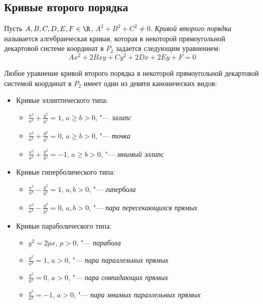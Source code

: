 {\subsection{Кривые второго порядка}

\begin{definition}
	Пусть $A, B, C, D, E, F \in \R$, $A^2 + B^2 + C^2 \ne 0$. \textit{Кривой второго порядка} называется алгебраическая кривая, которая в некоторой прямоугольной декартовой системе координат в $P_2$ задается следующим уравнением:
	\[Ax^2 + 2Bxy + Cy^2 + 2Dx + 2Ey + F = 0\]
\end{definition}

\begin{theorem}
	Любое уравнение кривой второго порядка в некоторой прямоугольной декартовой системой координат в $P_2$ имеет один из девяти канонических видов:
	\begin{itemize}
		\item Кривые эллиптического типа:
		\begin{itemize}
			\item $\frac{x^2}{a^2} + \frac{y^2}{b^2} = 1$, $a \ge b > 0$, "--- \textit{эллипс}
			\item $\frac{x^2}{a^2} + \frac{y^2}{b^2} = 0$, $a \ge b > 0$, "--- \textit{точка}
			\item $\frac{x^2}{a^2} + \frac{y^2}{b^2} = -1$, $a \ge b > 0$, "--- \textit{мнимый эллипс}
		\end{itemize}
	
		\item Кривые гиперболического типа:
		\begin{itemize}
			\item $\frac{x^2}{a^2} - \frac{y^2}{b^2} = 1$, $a, b > 0$, "--- \textit{гипербола}
			\item $\frac{x^2}{a^2} - \frac{y^2}{b^2} = 0$, $a, b > 0$, "--- \textit{пара пересекающихся прямых}
		\end{itemize}
	
		\item Кривые параболического типа:
		\begin{itemize}
			\item $y^2 = 2px$, $p > 0$, "--- \textit{парабола}
			\item $\frac{y^2}{a^2} = 1$, $a > 0$, "--- \textit{пара параллельных прямых}
			\item $\frac{y^2}{a^2} = 0$, $a > 0$, "--- \textit{пара совпадающих прямых}
			\item $\frac{y^2}{a^2} = -1$, $a > 0$, "--- \textit{пара мнимых параллельных прямых}
		\end{itemize}
	\end{itemize}
\end{theorem}

}
